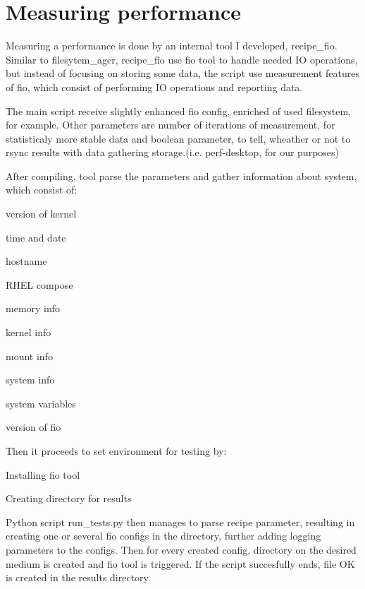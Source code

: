 \documentclass[
  color, %
  table, %
  lof,   %
  lot,   %
]{fithesis3}
\begin{document}
\section{Measuring performance}
Measuring a performance is done by an internal tool I developed, recipe\_fio. Similar to filesytem\_ager, recipe\_fio use fio tool to handle needed IO operations, but instead of focusing on storing some data, the script use measurement features of fio, which consist of performing IO operations and reporting data.

The main script receive slightly enhanced fio config, enriched of used filesystem, for example. Other parameters are number of iterations of measurement, for statisticaly more stable data and boolean parameter, to tell, wheather or not to rsync results with data gathering storage.(i.e. perf-desktop, for our purposes)

After compiling, tool parse the parameters and gather information about system, which consist of:

\begin{compactenum}
  \item version of kernel
  \item time and date
  \item hostname
  \item RHEL compose
  \item memory info
  \item kernel info
  \item mount info
  \item system info
  \item system variables
  \item version of fio
\end{compactenum}

Then it proceeds to set environment for testing by:

\begin{compactenum}
  \item Installing fio tool
  \item Creating directory for results
\end{compactenum}

Python script run\_tests.py then manages to parse recipe parameter, resulting in creating one or several fio configs in the directory, further adding logging parameters to the configs. Then for every created config, directory on the desired medium is created and fio tool is triggered. If the script succesfully ends, file OK is created in the results directory.
\end{document}
